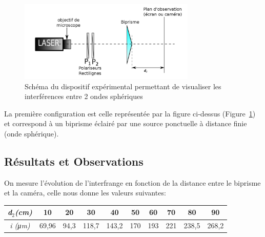 \documentclass[11pt, a4paper]{article}
\begin{document}
    \begin{figure}[hbtp] %
        \centering %
        \includegraphics[width=0.75\textwidth]{schema1} %
        \caption{Schéma du dispositif expérimental permettant de visualiser les interférences entre 2 ondes sphériques} %
        \label{schema1}%
    \end{figure}
    \par
    La première configuration est celle représentée par la figure ci-dessus (Figure~\ref{schema1}) et correspond à un biprisme éclairé par une source ponctuelle à distance finie (onde sphérique).
\subsection{Résultats et Observations}
    On mesure l'évolution de l'interfrange en fonction de la distance entre le biprisme et la caméra, celle nous donne les valeurs suivantes:
    \begin{table}[htbp]
        \centering
    \begin{tabular}{|c|c|c|c|c|c|c|c|c|c|}
        \hline  
        \textit{d$_{2}$(cm)}&10&20&30&40&50&60&70&80&90\\
        \hline
        \textit{i (μm)}&69,96&94,3&118,7&143,2&170&193&221&238,5&268,2
        \\
        \hline 
    \end{tabular}
    \end{table}
\end{document}

